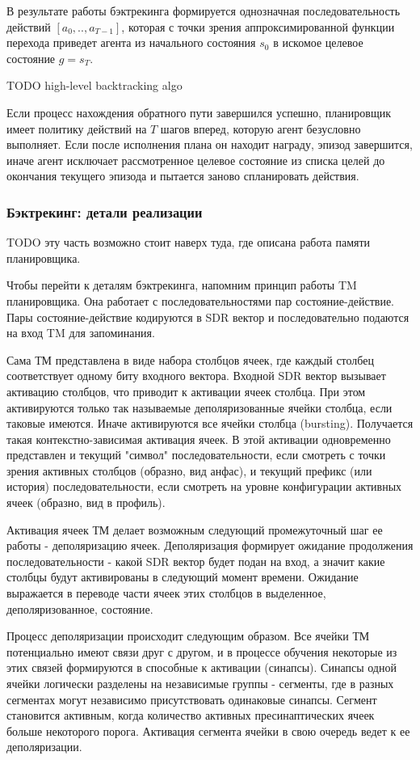 \documentclass[a4paper]{article}
\begin{document}
В результате работы бэктрекинга формируется однозначная последовательность действий $[a_0, .. , a_{T-1}]$, которая с точки зрения аппроксимированной функции перехода приведет агента из начального состояния $s_0$ в искомое целевое состояние $g = s_T$.

TODO high-level backtracking algo

Если процесс нахождения обратного пути завершился успешно, планировщик имеет политику действий на $T$ шагов вперед, которую агент безусловно выполняет. Если после исполнения плана он находит награду, эпизод завершится, иначе агент исключает рассмотренное целевое состояние из списка целей до окончания текущего эпизода и пытается заново спланировать действия.

\subsubsection{Бэктрекинг: детали реализации}

TODO эту часть возможно стоит наверх туда, где описана работа памяти планировщика.

Чтобы перейти к деталям бэктрекинга, напомним принцип работы TM планировщика. Она работает с последовательностями пар состояние-действие. Пары состояние-действие кодируются в SDR вектор и последовательно подаются на вход TM для запоминания.

Сама ТМ представлена в виде набора столбцов ячеек, где каждый столбец соответствует одному биту входного вектора. Входной SDR вектор вызывает активацию столбцов, что приводит к активации ячеек столбца. При этом активируются только так называемые деполяризованные ячейки столбца, если таковые имеются. Иначе активируются все ячейки столбца (bursting). Получается такая контекстно-зависимая активация ячеек. В этой активации одновременно представлен и текущий "символ" последовательности, если смотреть с точки зрения активных столбцов (образно, вид анфас), и текущий префикс (или история) последовательности, если смотреть на уровне конфигурации активных ячеек (образно, вид в профиль).

Активация ячеек ТМ делает возможным следующий промежуточный шаг ее работы - деполяризацию ячеек. Деполяризация формирует ожидание продолжения последовательности - какой SDR вектор будет подан на вход, а значит какие столбцы будут активированы в следующий момент времени. Ожидание выражается в переводе части ячеек этих столбцов в выделенное, деполяризованное, состояние.

Процесс деполяризации происходит следующим образом. Все ячейки ТМ потенциально имеют связи друг с другом, и в процессе обучения некоторые из этих связей формируются в способные к активации (синапсы). Синапсы одной ячейки логически разделены на независимые группы - сегменты, где в разных сегментах могут независимо присутствовать одинаковые синапсы. Сегмент становится активным, когда количество активных пресинаптических ячеек больше некоторого порога. Активация сегмента ячейки в свою очередь ведет к ее деполяризации.
\end{document}
